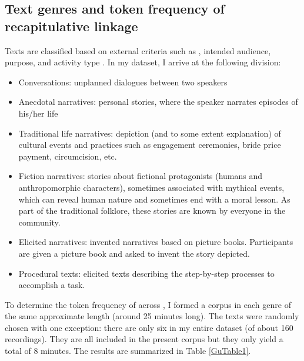 \documentclass[output=paper]{LSP/langsci}
\begin{document}
\subsection{Text genres and token frequency of recapitulative linkage} 
\label{Gusec:frequency}
Texts are classified based on external criteria such as , intended audience,
\noindent
purpose, and activity type \citep[][38]{lee01}. In my  dataset, I arrive at the following division: 

\begin{itemize}
\item  Conversations: unplanned dialogues between two speakers
\item Anecdotal narratives: personal stories, where the speaker narrates episodes of his/her life
\item Traditional life narratives: depiction (and to some extent explanation) of cultural events and practices such as engagement ceremonies, bride price payment, circumcision, etc.
\item Fiction narratives: stories about fictional protagonists (humans and anthropomorphic characters), sometimes associated with mythical events, which can reveal human nature and sometimes end with a moral lesson. As part of the traditional folklore, these stories are known by everyone in the community.
\item Elicited narratives: invented narratives based on picture books. Participants are given a picture book and asked to invent the story depicted.
\item Procedural texts: elicited texts describing the step-by-step processes to accomplish a task. 
\end{itemize}

To determine the token frequency of  across , I formed a corpus in each genre of the same approximate length (around 25 minutes long). The texts were randomly chosen with one exception: there are only six  in my entire dataset (of about 160 recordings). They are all included in the present corpus but they only yield a total of 8 minutes. The results are summarized in Table \ref{GuTable1}.  
\end{document}
